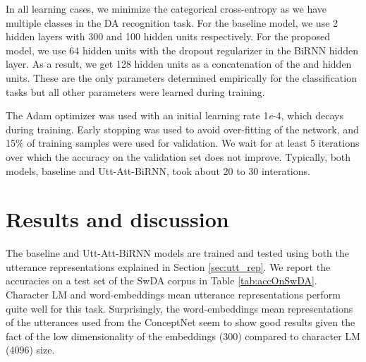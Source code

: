 \documentclass[a4paper]{article}
\begin{document}
In all learning cases, we minimize the categorical cross-entropy as we have multiple classes in the DA recognition task. 
For the baseline model, we use 2 hidden layers with 300 and 100 hidden units respectively. For the proposed model, we use 64 hidden units with the dropout regularizer \cite{hinton2012improving} in the BiRNN hidden layer. As a result, we get 128 hidden units as a concatenation of the  and  hidden units. 
These are the only parameters determined empirically for the classification tasks but all other parameters were learned during training.

The Adam optimizer \cite{kingma2014adam} was used with an initial learning rate 1\textit{e}-4, which decays during training.
Early stopping was used to avoid over-fitting of the network, and 15\% of training samples were used for validation. 
We wait for at least 5 iterations over which the accuracy on the validation set does not improve.
Typically, both models, baseline and Utt-Att-BiRNN, took about 20 to 30 interations.

\section{Results and discussion}

The baseline and Utt-Att-BiRNN models are trained and tested using both the utterance representations explained in Section \ref{sec:utt_rep}. 
We report the accuracies on a test set of the SwDA corpus in Table \ref{tab:accOnSwDA}. 
Character LM and word-embeddings mean utterance representations perform quite well for this task. 
Surprisingly, the word-embeddings mean representations of the utterances used from the ConceptNet seem to show good results given the fact of the low dimensionality of the embeddings (300) compared to character LM (4096) size.
\end{document}
